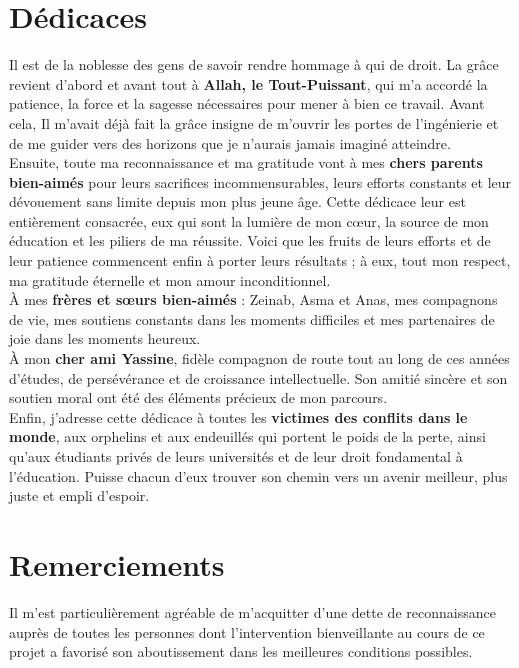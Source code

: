 \documentclass{rapportPFEHIND}
\begin{document}
\section*{Dédicaces}
Il est de la noblesse des gens de savoir rendre hommage à qui de droit. La grâce revient d'abord et avant tout à \textbf{Allah, le Tout-Puissant}, qui m'a accordé la patience, la force et la sagesse nécessaires pour mener à bien ce travail. Avant cela, Il m'avait déjà fait la grâce insigne de m'ouvrir les portes de l'ingénierie et de me guider vers des horizons que je n'aurais jamais imaginé atteindre.\\[6pt]
Ensuite, toute ma reconnaissance et ma gratitude vont à mes \textbf{chers parents bien-aimés} pour leurs sacrifices incommensurables, leurs efforts constants et leur dévouement sans limite depuis mon plus jeune âge. Cette dédicace leur est entièrement consacrée, eux qui sont la lumière de mon cœur, la source de mon éducation et les piliers de ma réussite. Voici que les fruits de leurs efforts et de leur patience commencent enfin à porter leurs résultats ; à eux, tout mon respect, ma gratitude éternelle et mon amour inconditionnel.\\[6pt]
À mes \textbf{frères et sœurs bien-aimés} : Zeinab, Asma et Anas, mes compagnons de vie, mes soutiens constants dans les moments difficiles et mes partenaires de joie dans les moments heureux.\\[6pt]
À mon \textbf{cher ami Yassine}, fidèle compagnon de route tout au long de ces années d'études, de persévérance et de croissance intellectuelle. Son amitié sincère et son soutien moral ont été des éléments précieux de mon parcours.\\[6pt]
Enfin, j'adresse cette dédicace à toutes les \textbf{victimes des conflits dans le monde}, aux orphelins et aux endeuillés qui portent le poids de la perte, ainsi qu'aux étudiants privés de leurs universités et de leur droit fondamental à l'éducation. Puisse chacun d'eux trouver son chemin vers un avenir meilleur, plus juste et empli d'espoir.
\vspace{2cm}
\clearpage

{}
\section*{Remerciements}

Il m'est particulièrement agréable de m'acquitter d'une dette de reconnaissance auprès de toutes les personnes dont l'intervention bienveillante au cours de ce projet a favorisé son aboutissement dans les meilleures conditions possibles.
\end{document}
